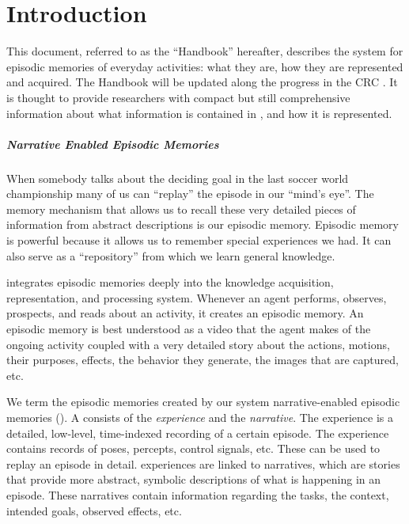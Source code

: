 \chapter{Introduction}

This document, referred to as the ``\neem Handbook'' hereafter,
describes the \ease system for episodic memories of everyday activities:
what they are, how they are represented and acquired.
The \neem Handbook will be updated along the progress in the CRC \ease.
It is thought to provide \ease researchers with compact but still comprehensive
information about what information is contained in \neems, and how it is represented.

\paragraph{Narrative Enabled Episodic Memories}
When somebody talks about the deciding goal in the
last soccer world championship many of us can ``replay'' the episode in our ``mind's eye''.
The memory mechanism that allows us to recall these very detailed pieces of
information from abstract descriptions is our episodic memory.
Episodic memory is powerful because it allows us to remember special
experiences we had. It can also serve as a ``repository'' from which we learn general knowledge.

\ease integrates episodic memories deeply into the knowledge acquisition, representation, and processing
system. Whenever an agent performs, observes, prospects, and
reads about an activity, it creates an episodic memory. An episodic
memory is best understood as a video that the agent makes of the
ongoing activity coupled with a very detailed story about the actions, motions, their purposes, effects,
the behavior they generate, the images that are captured, etc.

We term the episodic memories created by our system narrative-enabled episodic memories (\neems).
A \neem consists of the \emph{\neem experience} and the \emph{\neem narrative}.
The \neem experience is a detailed, low-level, time-indexed recording
of a certain episode. The experience contains records of poses, percepts, control signals, etc.
These can be used to replay an episode in detail.
\neem experiences are linked to \neem narratives, which are stories
that provide more abstract, symbolic descriptions of what is happening in an episode.
These narratives contain information regarding the tasks, the context, intended goals, observed effects, etc.


